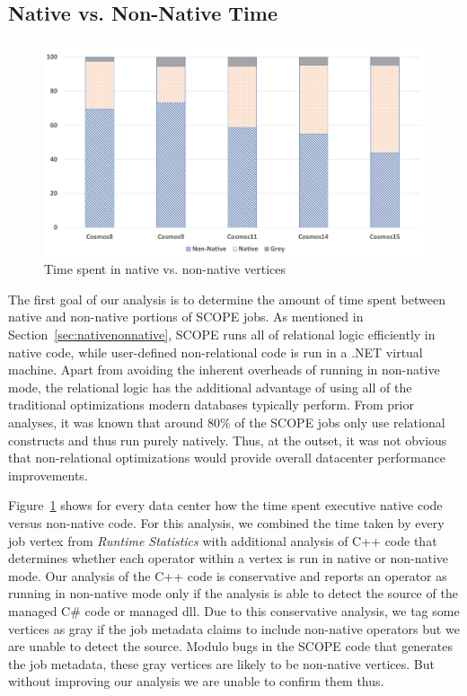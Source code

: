 \subsection{Native vs. Non-Native Time}
\begin{figure}[ht]
\includegraphics[width=2\columnwidth]{graphs/proportions.pdf}
\caption{Time spent in native vs. non-native vertices}
\label{fig:nativeVsNonNative}
\end{figure}
The first goal of our analysis is to determine the amount of time spent between native and non-native portions of SCOPE jobs. 
As mentioned in Section~\ref{sec:nativenonnative}, SCOPE runs all of relational logic efficiently in native code, while user-defined non-relational code is run in a .NET virtual machine. 
Apart from avoiding the inherent overheads of running in non-native mode, the relational logic has the additional advantage of using all of the traditional optimizations modern databases typically perform.
From prior analyses, it was known that around $80$\% of the SCOPE jobs only use relational constructs and thus run purely natively. 
Thus, at the outset, it was not obvious that non-relational optimizations would provide overall datacenter performance improvements. 



Figure~\ref{fig:nativeVsNonNative} shows for every data center how the time spent executive native code versus non-native code. 
For this analysis, we combined the time taken by every job vertex from \emph{Runtime Statistics} with additional analysis of C++ code that determines whether each operator within a vertex is run in native or non-native mode. 
Our analysis of the C++ code is conservative and reports an operator as running in non-native mode only if the analysis is able to detect the source of the managed C\# code or managed dll. 
Due to this conservative analysis, we tag some vertices as gray if the job metadata claims to include non-native operators but we are unable to detect the source. 
Modulo bugs in the SCOPE code that generates the job metadata, these gray vertices are likely to be non-native vertices. But without improving our analysis we are unable to confirm them thus. 

